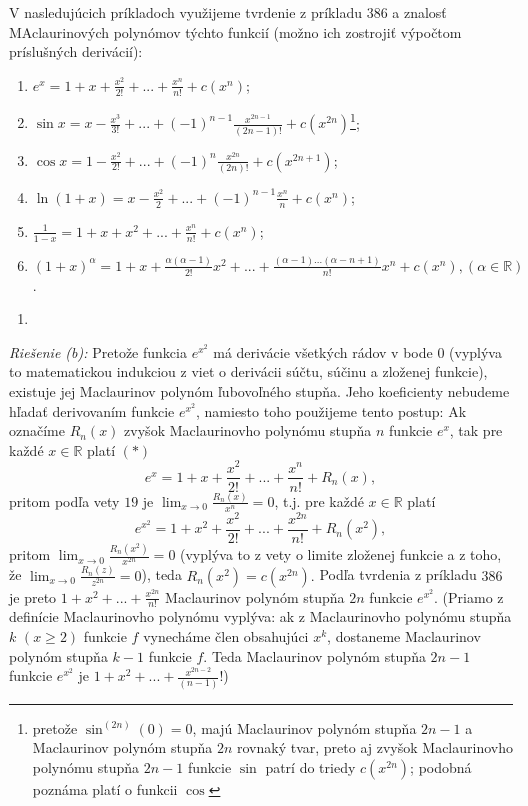 V nasledujúcich príkladoch využijeme tvrdenie z príkladu $386$ a znalosť MAclaurinových polynómov týchto funkcií (možno ich zostrojiť výpočtom príslušných derivácií):
\begin{enumerate}
\item $e^x=1+x+\frac{x^2}{2!}+...+\frac{x^n}{n!}+c(x^n)$;
\item $\sin x=x-\frac{x^3}{3!}+...+(-1)^{n-1}\frac{x^{2n-1}}{(2n-1)!}+c(x^{2n})$\footnote{pretože $\sin^{(2n)}(0)=0$, majú Maclaurinov polynóm stupňa $2n-1$ a Maclaurinov polynóm stupňa $2n$ rovnaký tvar, preto aj zvyšok Maclaurinovho polynómu stupňa $2n-1$ funkcie $\sin$ patrí do triedy $c(x^{2n})$; podobná poznáma platí o funkcii $\cos$};
\item $\cos x=1-\frac{x^2}{2!}+...+(-1)^{n}\frac{x^{2n}}{(2n)!}+c(x^{2n+1})$;
\item $\ln (1+x)=x-\frac{x^2}{2}+...+(-1)^{n-1}\frac{x^n}{n}+c(x^n)$;
\item $\frac{1}{1-x}=1+x+x^2+...+\frac{x^n}{n!}+c(x^n)$;
\item $(1+x)^{\alpha}=1+x+\frac{\alpha(\alpha-1)}{2!}x^2+...+\frac{(\alpha-1)...(\alpha-n+1)}{n!}x^n+c(x^n),(\alpha\in\mathbb{R})$.
\end{enumerate}

\begin{enumerate}[resume]
	\item {}
\end{enumerate}

\textit{Riešenie (b):}
Pretože funkcia $e^{x^2}$ má derivácie všetkých rádov v bode $0$ (vyplýva to matematickou indukciou z viet o derivácii súčtu, súčinu a zloženej funkcie), existuje jej Maclaurinov polynóm ľubovoľného stupňa. Jeho koeficienty nebudeme hľadať derivovaním funkcie $e^{x^2}$, namiesto toho použijeme tento postup:
Ak označíme $R_n(x)$ zvyšok Maclaurinovho polynómu stupňa $n$ funkcie $e^x$, tak pre každé $x\in\mathbb{R}$ platí $(*)$
$$e^x=1+x+\frac{x^2}{2!}+...+\frac{x^n}{n!}+R_n(x),$$ 
pritom podľa vety $19$ je $\lim_{x\rightarrow 0}\frac{R_n(x)}{x^n}=0$, t.j. pre každé $x\in\mathbb{R}$ platí 
$$e^{x^2}=1+x^2+\frac{x^2}{2!}+...+\frac{x^{2n}}{n!}+R_n(x^2),$$
pritom $\lim_{x\rightarrow 0}\frac{R_n(x^2)}{x^{2n}}=0$ (vyplýva to z vety o limite zloženej funkcie a z toho, že $\lim_{x\rightarrow 0}\frac{R_n(z)}{z^{2n}}=0$), teda $R_n(x^2)=c(x^{2n}).$ Podľa tvrdenia z príkladu $386$ je preto $1+x^2+...+\frac{x^{2n}}{n!}$ Maclaurinov polynóm stupňa $2n$ funkcie $e^{x^2}$.
(Priamo z definície Maclaurinovho polynómu vyplýva: ak z Maclaurinovho polynómu stupňa $k$ $(x\geq 2)$ funkcie $f$ vynecháme člen obsahujúci $x^k$, dostaneme Maclaurinov polynóm stupňa $k-1$ funkcie $f$. Teda Maclaurinov polynóm stupňa $2n-1$ funkcie $e^{x^2}$ je $1+x^2+...+\frac{x^{2n-2}}{(n-1)}$!)


